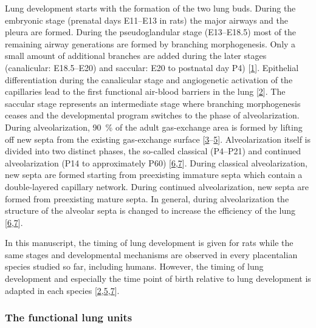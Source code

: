 \documentclass[
  american,
]{article}
\begin{document}
Lung development starts with the formation of the two lung buds.
During the embryonic stage (prenatal days E11--E13 in rats) the major airways and the pleura are formed.
During the pseudoglandular stage (E13--E18.5) most of the remaining airway generations are formed by branching morphogenesis.
Only a small amount of additional branches are added during the later stages (canalicular: E18.5--E20) and saccular: E20 to postnatal day P4) {[}\protect\hyperlink{ref-TsNwin2E}{1}{]}.
Epithelial differentiation during the canalicular stage and angiogenetic activation of the capillaries lead to the first functional air-blood barriers in the lung {[}\protect\hyperlink{ref-ODQCVC23}{2}{]}.
The saccular stage represents an intermediate stage where branching morphogenesis ceases and the developmental program switches to the phase of alveolarization.
During alveolarization, 90~\% of the adult gas-exchange area is formed by lifting off new septa from the existing gas-exchange surface {[}\protect\hyperlink{ref-auNiE56G}{3}--\protect\hyperlink{ref-XQLPrPTJ}{5}{]}.
Alveolarization itself is divided into two distinct phases, the so-called classical (P4--P21) and continued alveolarization (P14 to approximately P60) {[}\protect\hyperlink{ref-wnl86DEM}{6},\protect\hyperlink{ref-d1YV8oOK}{7}{]}.
During classical alveolarization, new septa are formed starting from preexisting immature septa which contain a double-layered capillary network.
During continued alveolarization, new septa are formed from preexisting mature septa.
In general, during alveolarization the structure of the alveolar septa is changed to increase the efficiency of the lung {[}\protect\hyperlink{ref-wnl86DEM}{6},\protect\hyperlink{ref-d1YV8oOK}{7}{]}.

In this manuscript, the timing of lung development is given for rats while the same stages and developmental mechanisms are observed in every placentalian species studied so far, including humans.
However, the timing of lung development and especially the time point of birth relative to lung development is adapted in each species {[}\protect\hyperlink{ref-ODQCVC23}{2},\protect\hyperlink{ref-XQLPrPTJ}{5},\protect\hyperlink{ref-d1YV8oOK}{7}{]}.

\hypertarget{the-functional-lung-units}{%
\subsubsection{The functional lung units}\label{the-functional-lung-units}}
\end{document}
